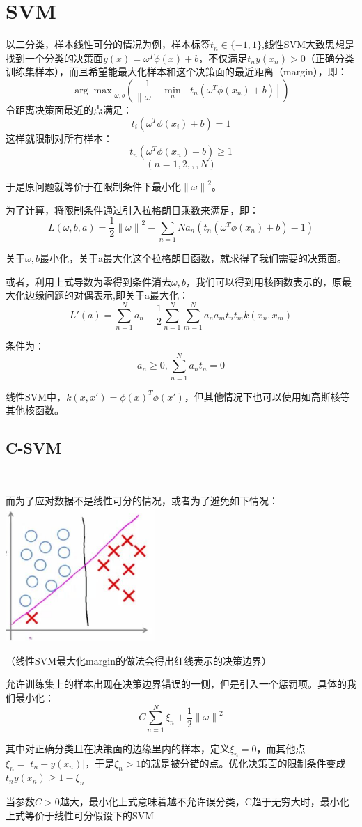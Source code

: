 \documentclass[hyperref,UTF8]{ctexart}
\begin{document}
\section*{SVM}
\par 以二分类，样本线性可分的情况为例，样本标签$t_n \in \{-1,1\}$,线性SVM大致思想是找到一个分类的决策面$y(x)=\omega^T\phi(x)+b$，不仅满足$t_n y(x_n)>0$（正确分类训练集样本），而且希望能最大化样本和这个决策面的最近距离（margin），即：
\[{\arg\max}_{\omega,b}(\frac{1}{\|{\omega}\|}{\min}_n[t_n(\omega^T\phi(x_n)+b)])\]
令距离决策面最近的点满足：
\[t_i(\omega^T\phi(x_i)+b) = 1\]
这样就限制对所有样本：
\[t_n(\omega^T\phi(x_n)+b) \ge 1\]\[(n = 1,2,,,N)\]
\par 于是原问题就等价于在限制条件下最小化${\|\omega\|}^2$。
\par 为了计算，将限制条件通过引入拉格朗日乘数来满足，即：
\[L(\omega,b,a)=\frac{1}{2}{\|\omega\|}^2-\sum_{n=1}{N}a_n(t_n(\omega^T\phi(x_n)+b)-1)  \]
\par 关于$\omega,b$最小化，关于a最大化这个拉格朗日函数，就求得了我们需要的决策面。
\par 或者，利用上式导数为零得到条件消去$\omega,b$，我们可以得到用核函数表示的，原最大化边缘问题的对偶表示,即关于a最大化：
\[L'(a)=\sum_{n=1}^{N}a_n-\frac{1}{2}\sum_{n=1}^{N}\sum_{m=1}^{N}a_n a_m t_n t_m k(x_n,x_m)\]
\par 条件为：
\[a_n\ge0,\sum_{n=1}^{N}a_n t_n =0\]
\par 线性SVM中，$k(x,x')=\phi(x)^T\phi(x')$，但其他情况下也可以使用如高斯核等其他核函数。

\subsection*{C-SVM}\
\par 而为了应对数据不是线性可分的情况，或者为了避免如下情况：\\
\includegraphics[height=2in]{exp-results/C-svm.jpg}
\par （线性SVM最大化margin的做法会得出红线表示的决策边界）
\par 允许训练集上的样本出现在决策边界错误的一侧，但是引入一个惩罚项。具体的我们最小化：
\[C\sum_{n=1}^{N}\xi_n + \frac{1}{2}{\|\omega\|}^2\]
\par 其中对正确分类且在决策面的边缘里内的样本，定义$\xi_n=0$，而其他点$\xi_n=|t_n-y(x_n)|$，于是$\xi_n>1$的就是被分错的点。优化决策面的限制条件变成$t_n y(x_n)\ge 1-\xi_n$
\par 当参数$C>0$越大，最小化上式意味着越不允许误分类，C趋于无穷大时，最小化上式等价于线性可分假设下的SVM
\end{document}
